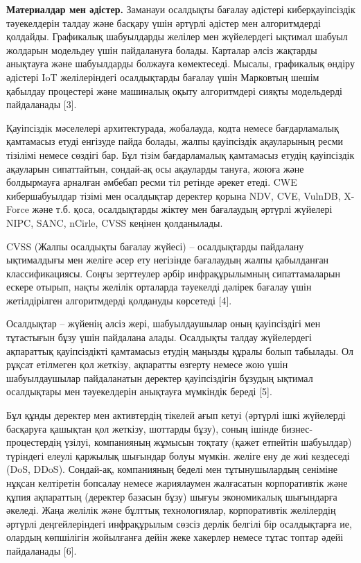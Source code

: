 \begin{multicols}{2}
{\bfseries Материалдар мен әдістер.} Заманауи осалдықты бағалау әдістері
киберқауіпсіздік тәуекелдерін талдау және басқару үшін әртүрлі әдістер
мен алгоритмдерді қолдайды. Графикалық шабуылдарды желілер мен
жүйелердегі ықтимал шабуыл жолдарын модельдеу үшін пайдалануға болады.
Карталар әлсіз жақтарды анықтауға және шабуылдарды болжауға көмектеседі.
Мысалы, графикалық өндіру әдістері IoT желілеріндегі осалдықтарды
бағалау үшін Марковтың шешім қабылдау процестері және машиналық оқыту
алгоритмдері сияқты модельдерді пайдаланады {[}3{]}.

Қауіпсіздік мәселелері архитектурада, жобалауда, кодта немесе
бағдарламалық қамтамасыз етуді енгізуде пайда болады, жалпы қауіпсіздік
ақауларының ресми тізілімі немесе сөздігі бар. Бұл тізім бағдарламалық
қамтамасыз етудің қауіпсіздік ақауларын сипаттайтын, сондай-ақ осы
ақауларды тануға, жоюға және болдырмауға арналған әмбебап ресми тіл
ретінде әрекет етеді. CWE кибершабуылдар тізімі мен осалдықтар деректер
қорына NDV, CVE, VulnDB, X-Force және т.б. қоса, осалдықтарды жіктеу мен
бағалаудың әртүрлі жүйелері NIPC, SANC, nCirle, CVSS кеңінен
қолданылады.

CVSS (Жалпы осалдықты бағалау жүйесі) -- осалдықтарды пайдалану
ықтималдығы мен желіге әсер ету негізінде бағалаудың жалпы қабылданған
классификациясы. Соңғы зерттеулер әрбір инфрақұрылымның сипаттамаларын
ескере отырып, нақты желілік орталарда тәуекелді дәлірек бағалау үшін
жетілдірілген алгоритмдерді қолдануды көрсетеді {[}4{]}.

Осалдықтар -- жүйенің әлсіз жері, шабуылдаушылар оның қауіпсіздігі мен
тұтастығын бұзу үшін пайдалана алады. Осалдықты талдау жүйелердегі
ақпараттық қауіпсіздікті қамтамасыз етудің маңызды құралы болып
табылады. Ол рұқсат етілмеген қол жеткізу, ақпаратты өзгерту немесе жою
үшін шабуылдаушылар пайдаланатын деректер қауіпсіздігін бұзудың ықтимал
осалдықтары мен тәуекелдерін анықтауға мүмкіндік береді {[}5{]}.

Бұл құнды деректер мен активтердің тікелей ағып кетуі (әртүрлі ішкі
жүйелерді басқаруға қашықтан қол жеткізу, шоттарды бұзу), соның ішінде
бизнес-процестердің үзілуі, компанияның жұмысын тоқтату (қажет етпейтін
шабуылдар) түріндегі елеулі қаржылық шығындар болуы мүмкін. желіге ену
де жиі кездеседі (DoS, DDoS). Сондай-ақ, компанияның беделі мен
тұтынушылардың сеніміне нұқсан келтіретін бопсалау немесе жариялаумен
жалғасатын корпоративтік және құпия ақпараттың (деректер базасын бұзу)
шығуы экономикалық шығындарға әкеледі. Жаңа желілік және бұлттық
технологиялар, корпоративтік желілердің әртүрлі деңгейлеріндегі
инфрақұрылым сөзсіз дерлік белгілі бір осалдықтарға ие, олардың
көпшілігін жойылғанға дейін жеке хакерлер немесе тұтас топтар әдейі
пайдаланады {[}6{]}.


\end{multicols}

